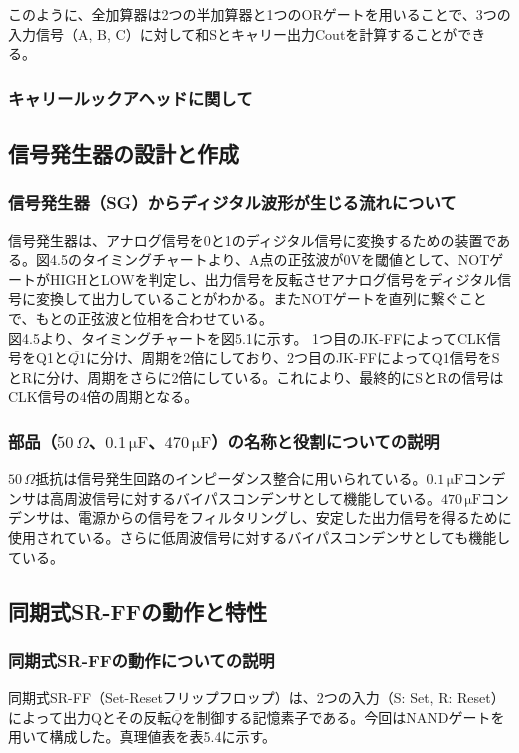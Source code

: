 \documentclass{jlreq}
\numberwithin{equation}{section}
\begin{document}
このように、全加算器は2つの半加算器と1つのORゲートを用いることで、3つの入力信号（A, B, C）に対して和Sとキャリー出力Coutを計算することができる。

\subsubsection{キャリールックアヘッドに関して}

\subsection{信号発生器の設計と作成}
\subsubsection{信号発生器（SG）からディジタル波形が生じる流れについて}
信号発生器は、アナログ信号を0と1のディジタル信号に変換するための装置である。図4.5のタイミングチャートより、A点の正弦波が0Vを閾値として、NOTゲートがHIGHとLOWを判定し、出力信号を反転させアナログ信号をディジタル信号に変換して出力していることがわかる。またNOTゲートを直列に繋ぐことで、もとの正弦波と位相を合わせている。\\
図4.5より、タイミングチャートを図5.1に示す。
1つ目のJK-FFによってCLK信号をQ1と\(\overline{Q1}\)に分け、周期を2倍にしており、2つ目のJK-FFによってQ1信号をSとRに分け、周期をさらに2倍にしている。これにより、最終的にSとRの信号はCLK信号の4倍の周期となる。

\subsubsection{部品（$50\,\Omega$、$0.1\,\mathrm{\mu F}$、$470\,\mathrm{\mu F}$）の名称と役割についての説明}
$50\,\Omega$抵抗は信号発生回路のインピーダンス整合に用いられている。$0.1\,\mathrm{\mu F}$コンデンサは高周波信号に対するバイパスコンデンサとして機能している。$470\,\mathrm{\mu F}$コンデンサは、電源からの信号をフィルタリングし、安定した出力信号を得るために使用されている。さらに低周波信号に対するバイパスコンデンサとしても機能している。

\subsection{同期式SR-FFの動作と特性}
\subsubsection{同期式SR-FFの動作についての説明}
同期式SR-FF（Set-Resetフリップフロップ）は、2つの入力（S: Set, R: Reset）によって出力Qとその反転$\overline{Q}$を制御する記憶素子である。今回はNANDゲートを用いて構成した。真理値表を表5.4に示す。
\end{document}
